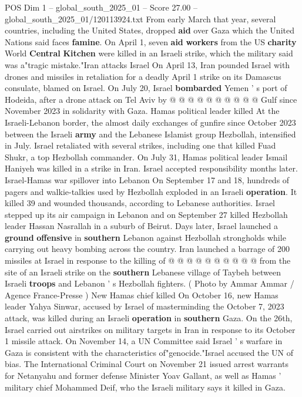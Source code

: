 \begin{textsample}{POS Dim 1 – global\_south\_2025\_01 – Score 27.00 – global\_south\_2025\_01/120113924.txt}
From early March that year, several countries, including the United States, dropped \textbf{aid} over Gaza which the United Nations said faces \textbf{famine}.
On April 1, seven \textbf{aid} \textbf{workers} from the US \textbf{charity} World \textbf{Central} \textbf{Kitchen} were killed in an Israeli strike, which the military said was a"tragic mistake."Iran attacks Israel On April 13, Iran pounded Israel with drones and missiles in retaliation for a deadly April 1 strike on its Damascus consulate, blamed on Israel.
On July 20, Israel \textbf{bombarded} Yemen ' s port of Hodeida, after a drone attack on Tel Aviv by @ @ @ @ @ @ @ @ @ @ Gulf since November 2023 in solidarity with Gaza.
Hamas political leader killed At the Israeli-Lebanon border, the almost daily exchanges of gunfire since October 2023 between the Israeli \textbf{army} and the Lebanese Islamist group Hezbollah, intensified in July.
Israel retaliated with several strikes, including one that killed Fuad Shukr, a top Hezbollah commander.
On July 31, Hamas political leader Ismail Haniyeh was killed in a strike in Iran.
Israel accepted responsibility months later.
Israel-Hamas war spillover into Lebanon On September 17 and 18, hundreds of pagers and walkie-talkies used by Hezbollah exploded in an Israeli \textbf{operation}.
It killed 39 and wounded thousands, according to Lebanese authorities.
Israel stepped up its air campaign in Lebanon and on September 27 killed Hezbollah leader Hassan Nasrallah in a suburb of Beirut.
Days later, Israel launched a \textbf{ground} \textbf{offensive} in \textbf{southern} Lebanon against Hezbollah strongholds while carrying out heavy bombing across the country.
Iran launched a barrage of 200 missiles at Israel in response to the killing of @ @ @ @ @ @ @ @ @ @ from the site of an Israeli strike on the \textbf{southern} Lebanese village of Taybeh between Israeli \textbf{troops} and Lebanon ' s Hezbollah fighters. ( Photo by Ammar Ammar / Agence France-Presse ) New Hamas chief killed On October 16, new Hamas leader Yahya Sinwar, accused by Israel of masterminding the October 7, 2023 attack, was killed during an Israeli \textbf{operation} in \textbf{southern} Gaza.
On the 26th, Israel carried out airstrikes on military targets in Iran in response to its October 1 missile attack.
On November 14, a UN Committee said Israel ' s warfare in Gaza is consistent with the characteristics of"genocide."Israel accused the UN of bias.
The International Criminal Court on November 21 issued arrest warrants for Netanyahu and former defense Minister Yoav Gallant, as well as Hamas ' military chief Mohammed Deif, who the Israeli military says it killed in Gaza.

\end{textsample}
